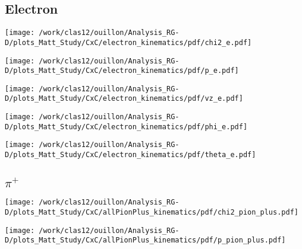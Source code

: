 \documentclass{report}
\begin{document}
    

    \subsection{Electron}
    \begin{minipage}{.5\textwidth}
        \centering
        \texttt{[image: /work/clas12/ouillon/Analysis\_RG-D/plots\_Matt\_Study/CxC/electron\_kinematics/pdf/chi2\_e.pdf]}
    \end{minipage}
    \begin{minipage}{.5\textwidth}
        \centering
        \texttt{[image: /work/clas12/ouillon/Analysis\_RG-D/plots\_Matt\_Study/CxC/electron\_kinematics/pdf/p\_e.pdf]}
    \end{minipage}

    \begin{minipage}{.5\textwidth}
        \centering
        \texttt{[image: /work/clas12/ouillon/Analysis\_RG-D/plots\_Matt\_Study/CxC/electron\_kinematics/pdf/vz\_e.pdf]}
    \end{minipage}
    \begin{minipage}{.5\textwidth}
        \centering
        \texttt{[image: /work/clas12/ouillon/Analysis\_RG-D/plots\_Matt\_Study/CxC/electron\_kinematics/pdf/phi\_e.pdf]}
    \end{minipage}

    \begin{minipage}{.5\textwidth}
        \centering
        \texttt{[image: /work/clas12/ouillon/Analysis\_RG-D/plots\_Matt\_Study/CxC/electron\_kinematics/pdf/theta\_e.pdf]}
    \end{minipage}
    \begin{minipage}{.5\textwidth}
    \end{minipage}

    \subsection{\(\pi^+\)}
    \begin{minipage}{.5\textwidth}
        \centering
        \texttt{[image: /work/clas12/ouillon/Analysis\_RG-D/plots\_Matt\_Study/CxC/allPionPlus\_kinematics/pdf/chi2\_pion\_plus.pdf]}
    \end{minipage}
    \begin{minipage}{.5\textwidth}
        \centering
        \texttt{[image: /work/clas12/ouillon/Analysis\_RG-D/plots\_Matt\_Study/CxC/allPionPlus\_kinematics/pdf/p\_pion\_plus.pdf]}
    \end{minipage}
\end{document}
